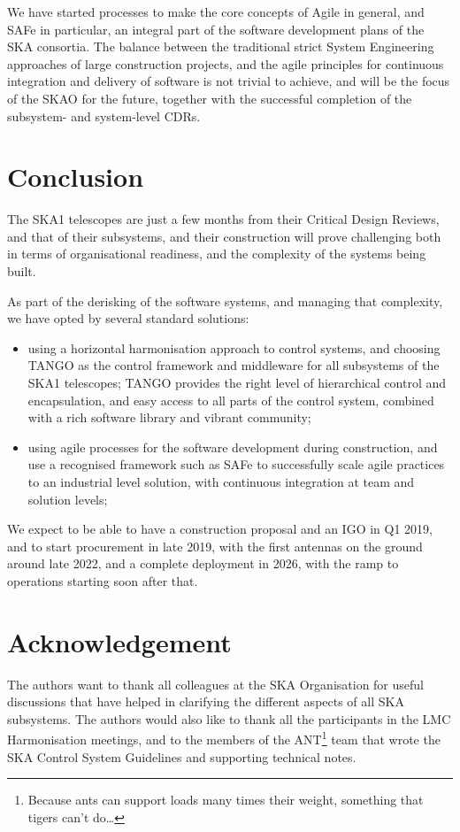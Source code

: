 \documentclass[a4paper,
               biblatex,       %
               keeplastbox,    %
               ]{jacow-2_1}    %
\begin{document}
We have started processes to make the core concepts of Agile in general, and SAFe in particular, an integral part of the software development plans of the SKA consortia. The balance between the traditional strict System Engineering approaches of large construction projects, and the agile principles for continuous integration and delivery of software is not trivial to achieve, and will be the focus of the SKAO for the future, together with the successful completion of the subsystem- and system-level CDRs.


\section{Conclusion} %
\label{sec:conclusion}
The SKA1 telescopes are just a few months from their Critical Design Reviews, and that of their subsystems, and their construction will prove challenging both in terms of organisational readiness, and the complexity of the systems being built.

As part of the derisking of the software systems, and managing that complexity, we have opted by several standard solutions:

\begin{itemize}
	\item using a horizontal harmonisation approach to control systems, and choosing TANGO as the control framework and middleware for all subsystems of the SKA1 telescopes; TANGO provides the right level of hierarchical control and encapsulation, and easy access to all parts of the control system, combined with a rich software library and vibrant community;
	\item using agile processes for the software development during construction, and use a recognised framework such as SAFe to successfully scale agile practices to an industrial level solution, with continuous integration at team and solution levels;
\end{itemize}

We expect to be able to have a construction proposal and an IGO in Q1 2019, and to start procurement in late 2019, with the first antennas on the ground around late 2022, and a complete deployment in 2026, with the ramp to operations starting soon after that.


\section{Acknowledgement} %
\label{sec:acknowledgement}
The authors want to thank all colleagues at the SKA Organisation for useful discussions that have helped in clarifying the different aspects of all SKA subsystems. The authors would also like to thank all the participants in the LMC Harmonisation meetings, and to the members of the ANT\footnote{Because ants can support loads many times their weight, something that tigers can't do…} team that wrote the SKA Control System Guidelines and supporting technical notes.


\label{sec:references}
\printbibliography

\end{document}
